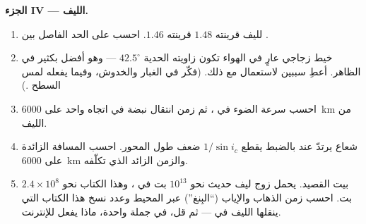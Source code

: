 \begin{problem}
\medskip
\noindent\textbf{الجزء IV --- الليف.}
\begin{enumerate}[resume]
  \item لليف  قرينته $1.48$  قرينته
        $1.46$. احسب  على الحد الفاصل بين 
        .
  \item خيط زجاجي عارٍ في الهواء تكون زاويته الحدية
        $42.5^\circ$ --- وهو أفضل بكثير في الظاهر. أعطِ سببين لاستعمال
         مع ذلك. (فكّر في الغبار والخدوش، وفيما يفعله
        لمس السطح .)
  \item احسب سرعة الضوء في ، ثم زمن انتقال
        نبضة في اتجاه واحد على \qty{6000}{km} من الليف.
  \item شعاع يرتدّ عند  بالضبط يقطع
        $1/\sin i_c$ ضعف طول المحور. احسب المسافة
        الزائدة على \qty{6000}{km} والزمن الزائد الذي تكلّفه.
  \item بيت القصيد. يحمل زوج ليف حديث نحو $10^{13}$ بت
        في ، وهذا الكتاب نحو $2.4 \times 10^8$ بت.
        احسب زمن الذهاب والإياب (``البِنغ'') عبر المحيط وعدد
        نسخ هذا الكتاب التي ينقلها الليف في  ---
        ثم قل، في جملة واحدة، ماذا يفعل 
        للإنترنت.
\end{enumerate}
\end{problem}
